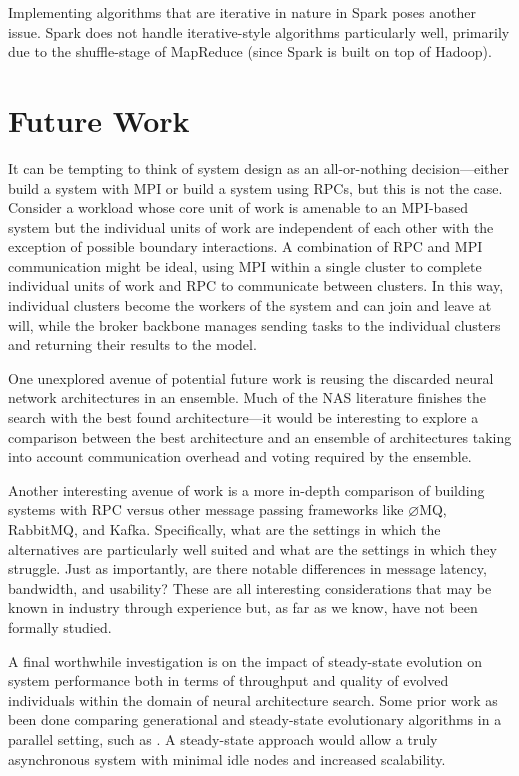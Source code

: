 \documentclass[conference]{IEEEtran}
\begin{document}
Implementing algorithms that are iterative in nature in Spark poses another
issue. Spark does not handle iterative-style algorithms particularly well,
primarily due to the shuffle-stage of MapReduce (since Spark is built on
top of Hadoop).

\section{Future Work}
It can be tempting to think of system design as an all-or-nothing
decision---either build a system with MPI or build a system using RPCs, but
this is not the case. Consider a workload
whose core unit of work is amenable to an MPI-based system but the individual
units of work are independent of each other with the exception of possible
boundary interactions. A combination of RPC and MPI communication might be
ideal, using MPI within a single cluster to complete individual units of work
and RPC to communicate between clusters. In this way, individual clusters become
the workers of the system and can join and leave at will, while the broker
backbone manages sending tasks to the individual clusters and returning their
results to the model.

One unexplored avenue of potential future work is reusing the discarded
neural network architectures in an ensemble. Much of the NAS literature
finishes the search with the best found architecture---it would be interesting
to explore a comparison between the best architecture and an ensemble of
architectures taking into account communication overhead and voting required
by the ensemble.

Another interesting avenue of work is  a more in-depth comparison of
building systems with RPC versus other message passing frameworks like
$\varnothing$MQ, RabbitMQ, and Kafka. Specifically, what are the settings
in which the alternatives are particularly well suited and what are the
settings in which they struggle. Just as importantly, are there notable
differences in message latency, bandwidth, and usability? These are all
interesting considerations that may be known in industry through experience
but, as far as we know, have not been formally studied.

A final worthwhile investigation is on the impact of steady-state evolution
on system performance both in terms of throughput and quality of evolved
individuals within the domain of neural architecture search.
Some prior work as been done comparing generational
and steady-state evolutionary algorithms in a parallel setting, such as
\cite{10.1007/3-540-45356-3_40, 10.1007/978-3-540-30217-9_26,
  Zavoianu:2015:PCG:2827032.2827154}. A steady-state approach would allow
a truly asynchronous system with minimal idle nodes and increased
scalability.
\end{document}
